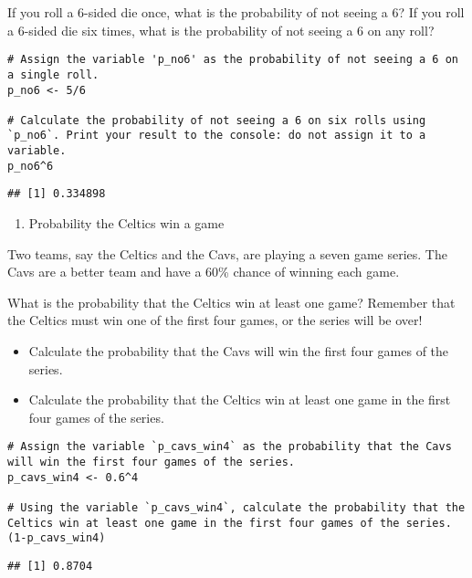 \documentclass[
]{article}
\providecommand{\tightlist}{%
  \setlength{\itemsep}{0pt}\setlength{\parskip}{0pt}}
\begin{document}
If you roll a 6-sided die once, what is the probability of not seeing a
6? If you roll a 6-sided die six times, what is the probability of not
seeing a 6 on any roll?

\begin{verbatim}
# Assign the variable 'p_no6' as the probability of not seeing a 6 on a single roll.
p_no6 <- 5/6

# Calculate the probability of not seeing a 6 on six rolls using `p_no6`. Print your result to the console: do not assign it to a variable.
p_no6^6
\end{verbatim}

\begin{verbatim}
## [1] 0.334898
\end{verbatim}

\begin{enumerate}
\def\labelenumi{\arabic{enumi}.}
\setcounter{enumi}{3}
\tightlist
\item
  Probability the Celtics win a game
\end{enumerate}

Two teams, say the Celtics and the Cavs, are playing a seven game
series. The Cavs are a better team and have a 60\% chance of winning
each game.

What is the probability that the Celtics win at least one game? Remember
that the Celtics must win one of the first four games, or the series
will be over!

\begin{itemize}
\tightlist
\item
  Calculate the probability that the Cavs will win the first four games
  of the series.
\item
  Calculate the probability that the Celtics win at least one game in
  the first four games of the series.
\end{itemize}

\begin{verbatim}
# Assign the variable `p_cavs_win4` as the probability that the Cavs will win the first four games of the series.
p_cavs_win4 <- 0.6^4

# Using the variable `p_cavs_win4`, calculate the probability that the Celtics win at least one game in the first four games of the series.
(1-p_cavs_win4)
\end{verbatim}

\begin{verbatim}
## [1] 0.8704
\end{verbatim}
\end{document}
